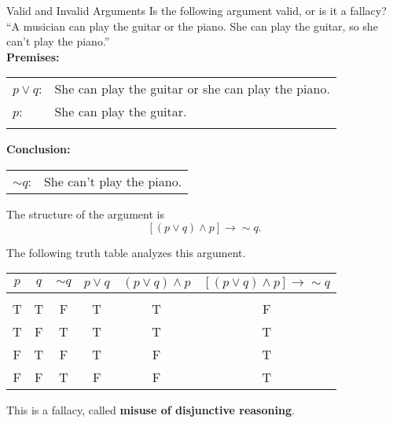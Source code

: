 \begin{example}[https://www.youtube.com/watch?v=uYJbdR7-uQU]{Valid and Invalid Arguments}
Is the following argument valid, or is it a fallacy?\\

``A musician can play the guitar or the piano.  She can play the guitar, so she can't play the piano.''\\

\textbf{Premises:}\\
\begin{tabular}{l l}
$p \vee q$: & She can play the guitar or she can play the piano.\\
$p$: & She can play the guitar.\\
& \\
\end{tabular}

\textbf{Conclusion:}\\
\begin{tabular}{l l}
$\sim q$: & She can't play the piano.
\end{tabular}

The structure of the argument is \[[(p \vee q) \wedge p] \to \sim q.\]
\vfill
\pagebreak

The following truth table analyzes this argument.
\begin{center}
\begin{tabular}{|c c c c c c|}
\hline
$p$ & $q$ & $\sim q$ & $p \vee q$ & $(p \vee q) \wedge p$ & $[(p \vee q) \wedge p] \to \sim q$\\
\hline
& & & & & \\
T & T & F & T & T & F\\
T & F & T & T & T & T\\
F & T & F & T & F & T\\
F & F & T & F & F & T\\
\hline
\end{tabular}
\end{center}

This is a fallacy, called \textbf{misuse of disjunctive reasoning}. 
\end{example}

